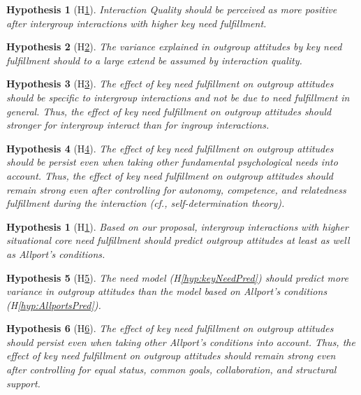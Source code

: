 \documentclass[man, 12pt, a4paper]{apa7}
\theoremstyle{break}
\theoremstyle{plain}
\newtheorem{hyp}{Hypothesis}
\newtheorem{subhyp}{Hypothesis}
\begin{document}
\begin{subhyp}[H\ref{hyp:keyNeedQual}] \label{hyp:keyNeedQual}
\addtolength{\leftskip}{2.5em}
Interaction Quality should be perceived as more positive after intergroup interactions with higher key need fulfillment.
\end{subhyp}

\begin{subhyp}[H\ref{hyp:keyNeedMediation}] \label{hyp:keyNeedMediation}
\addtolength{\leftskip}{2.5em}
The variance explained in outgroup attitudes by key need fulfillment should to a large extend be assumed by interaction quality.
\end{subhyp}

\begin{subhyp}[H\ref{hyp:keyNeedContactType}] \label{hyp:keyNeedContactType}
\addtolength{\leftskip}{2.5em}
The effect of key need fulfillment on outgroup attitudes should be specific to intergroup interactions and not be due to need fulfillment in general. Thus, the effect of key need fulfillment on outgroup attitudes should stronger for intergroup interact than for ingroup interactions. 
\end{subhyp}

\begin{subhyp}[H\ref{hyp:keyNeedSDT}] \label{hyp:keyNeedSDT}
\addtolength{\leftskip}{2.5em}
The effect of key need fulfillment on outgroup attitudes should be persist even when taking other fundamental psychological needs into account. Thus, the effect of key need fulfillment on outgroup attitudes should remain strong even after controlling for autonomy, competence, and relatedness fulfillment during the interaction (cf., self-determination theory). 
\end{subhyp}

\begin{hyp}[H\ref{hyp:comparison}] \label{hyp:comparison}
Based on our proposal, intergroup interactions with higher situational core need fulfillment should predict outgroup attitudes at least as well as Allport's conditions.
\end{hyp}

\setcounter{subhyp}{0}
\begin{subhyp}[H\ref{hyp:compModel}] \label{hyp:compModel}
\addtolength{\leftskip}{2.5em}
The need model (H\ref{hyp:keyNeedPred}) should predict more variance in outgroup attitudes than the model based on Allport's conditions (H\ref{hyp:AllportsPred}).
\end{subhyp}

\begin{subhyp}[H\ref{hyp:compTogether}] \label{hyp:compTogether}
\addtolength{\leftskip}{2.5em}
The  effect of key need fulfillment on outgroup attitudes should  persist even when taking other Allport's conditions into account. Thus, the effect of key need fulfillment on outgroup attitudes should remain strong even after controlling for equal status, common goals, collaboration, and structural support.  
\end{subhyp}
\end{document}
